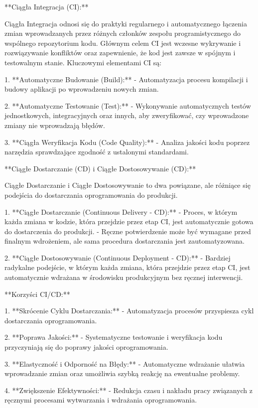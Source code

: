 **Ciągła Integracja (CI):**

Ciągła Integracja odnosi się do praktyki regularnego i automatycznego łączenia zmian wprowadzanych przez różnych członków zespołu programistycznego do wspólnego repozytorium kodu. Głównym celem CI jest wczesne wykrywanie i rozwiązywanie konfliktów oraz zapewnienie, że kod jest zawsze w spójnym i testowalnym stanie. Kluczowymi elementami CI są:

1. **Automatyczne Budowanie (Build):**
   - Automatyzacja procesu kompilacji i budowy aplikacji po wprowadzeniu nowych zmian.

2. **Automatyczne Testowanie (Test):**
   - Wykonywanie automatycznych testów jednostkowych, integracyjnych oraz innych, aby zweryfikować, czy wprowadzone zmiany nie wprowadzają błędów.

3. **Ciągła Weryfikacja Kodu (Code Quality):**
   - Analiza jakości kodu poprzez narzędzia sprawdzające zgodność z ustalonymi standardami.

**Ciągłe Dostarczanie (CD) i Ciągłe Dostosowywanie (CD):**

Ciągłe Dostarczanie i Ciągłe Dostosowywanie to dwa powiązane, ale różniące się podejścia do dostarczania oprogramowania do produkcji.

1. **Ciągłe Dostarczanie (Continuous Delivery - CD):**
   - Proces, w którym każda zmiana w kodzie, która przejdzie przez etap CI, jest automatycznie gotowa do dostarczenia do produkcji.
   - Ręczne potwierdzenie może być wymagane przed finalnym wdrożeniem, ale sama procedura dostarczania jest zautomatyzowana.

2. **Ciągłe Dostosowywanie (Continuous Deployment - CD):**
   - Bardziej radykalne podejście, w którym każda zmiana, która przejdzie przez etap CI, jest automatycznie wdrażana w środowisku produkcyjnym bez ręcznej interwencji.

**Korzyści CI/CD:**

1. **Skrócenie Cyklu Dostarczania:**
   - Automatyzacja procesów przyspiesza cykl dostarczania oprogramowania.

2. **Poprawa Jakości:**
   - Systematyczne testowanie i weryfikacja kodu przyczyniają się do poprawy jakości oprogramowania.

3. **Elastyczność i Odporność na Błędy:**
   - Automatyczne wdrażanie ułatwia wprowadzanie zmian oraz umożliwia szybką reakcję na ewentualne problemy.

4. **Zwiększenie Efektywności:**
   - Redukcja czasu i nakładu pracy związanych z ręcznymi procesami wytwarzania i wdrażania oprogramowania.

